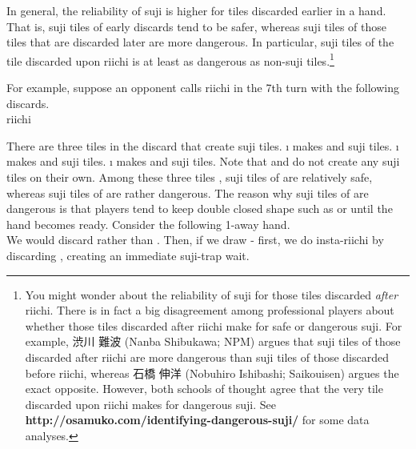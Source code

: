 {{\bigskip
In general, the reliability of {\jap suji} is higher for tiles discarded earlier in a hand. That is, {\jap suji} tiles of early discards tend to be safer, whereas {\jap suji} tiles of those tiles that are discarded later are more dangerous. In particular, {\jap suji} tiles of the tile discarded upon riichi is at least as dangerous as non-{\jap suji} tiles.\footnote{You might wonder about the reliability of {\jap suji} for those tiles discarded \emph{after} riichi. There is in fact a big disagreement among professional players about whether those tiles discarded after riichi make for safe or dangerous {\jap suji}. For example, 渋川 難波 (Nanba Shibukawa; NPM) argues that {\jap suji} tiles of those discarded after riichi are more dangerous than {\jap suji} tiles of those discarded before riichi, whereas 石橋 伸洋 (Nobuhiro Ishibashi; {\jap Saikouisen}) argues the exact opposite. However, both schools of thought agree that the very tile discarded upon riichi makes for dangerous {\jap suji}. See \textbf{http://osamuko.com/identifying-dangerous-suji/} for some data analyses.} 

\bigskip
For example, suppose an opponent calls riichi in the 7th turn with the following discards.
\bp
\bei\fa{}\\
\hspace{112pt}\footnotesize{riichi}
\ep

\bigskip
There are three tiles in the discard that create {\jap suji} tiles.
\bi
\i {\LARGE{}} makes {\LARGE{}} and {\LARGE{}} {\jap suji} tiles.
\i {\LARGE{}} makes {\LARGE{}} and {\LARGE{}} {\jap suji} tiles.
\i {\LARGE{}} makes {\LARGE{}} and {\LARGE{}} {\jap suji} tiles.
\ei
Note that {\LARGE{}} and {\LARGE{}} do not create any {\jap suji} tiles on their own. Among these three tiles {\LARGE{}}, {\jap suji} tiles of {\LARGE{}} are relatively safe, whereas {\jap suji} tiles of {\LARGE{}} are rather dangerous. 
The reason why {\jap suji} tiles of {\LARGE{}} are dangerous is that players tend to keep double closed shape such as {\LARGE{}} or {\LARGE{}} until the hand becomes ready. Consider the following 1-away hand. 
\bp
{}\\ \vspace{-16pt}
\rfd{}
\ep
We would discard {\LARGE{}} rather than {\LARGE{}}.
Then, if we draw {\LARGE{}-} first, we do insta-riichi by discarding {\LARGE{}}, creating an immediate {\jap suji}-trap wait. 

}}
